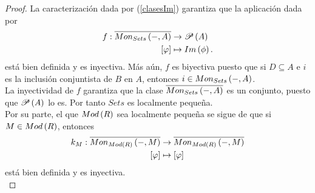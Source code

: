 \documentclass{article}
\begin{document}
\begin{enumerate}[label=\textbf{Ej \arabic*.}]
\begin{proof}
			La caracterización dada por (\ref{clasesIm}) garantiza que
			la aplicación dada por
			\begin{align*}
				f: \overline{Mon_{Sets}\left(-,A\right)} &\rightarrow \mathscr{P}\left(A\right)\\ \left[\varphi\right] &\mapsto Im\left(\phi\right).
			\end{align*}
			está bien definida y es inyectiva. Más aún, $f$ es biyectiva puesto que si $D\subseteq A$  e $i$ es la inclusión conjuntista de $B$ en $A$, entonces $i\in Mon_{Sets}\left(-,A\right)$.\\
			La inyectividad de $f$ garantiza que la clase $\overline{Mon_{Sets}\left(-,A\right)}$ es un conjunto, puesto que $\mathscr{P}\left(A\right)$ lo es. Por tanto $Sets$ es localmente pequeña.\\
			
			Por su parte, el que $Mod\left(R\right)$ sea localmente pequeña se sigue de que si $M\in Mod\left(R\right)$, entonces
			\begin{align*}
				k_M: \overline{Mon_{Mod\left(R\right)}\left(-,M\right)} &\rightarrow \overline{Mon_{Mod\left(R\right)}\left(-,M\right)}\\ \left[\varphi\right] &\mapsto \left[\varphi\right]
			\end{align*}
			está bien definida y es inyectiva.\\
		\end{proof}
	\end{enumerate}		
\end{document}
